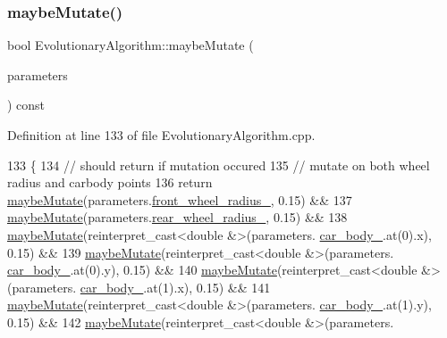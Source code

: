 \subsubsection{\texorpdfstring{maybe\+Mutate()}{maybeMutate()}\hspace{0.1cm}{\footnotesize\ttfamily [2/2]}}
{\footnotesize\ttfamily bool Evolutionary\+Algorithm\+::maybe\+Mutate (\begin{DoxyParamCaption}\item[{\hyperlink{classCarParameters}{Car\+Parameters} \&}]{parameters }\end{DoxyParamCaption}) const}



Definition at line 133 of file Evolutionary\+Algorithm.\+cpp.


\begin{DoxyCode}
133                                                                         \{
134     \textcolor{comment}{// should return if mutation occured}
135     \textcolor{comment}{// mutate on both wheel radius and carbody points}
136     \textcolor{keywordflow}{return} \hyperlink{classEvolutionaryAlgorithm_a19c58cc0434d314fb5378e3674546988}{maybeMutate}(parameters.\hyperlink{classCarParameters_ab66832af7618ebe04364630c92850096}{front\_wheel\_radius\_}, 0.15) &&
137            \hyperlink{classEvolutionaryAlgorithm_a19c58cc0434d314fb5378e3674546988}{maybeMutate}(parameters.\hyperlink{classCarParameters_a6d3c3fc1c4eef292a7f536da2a089bbd}{rear\_wheel\_radius\_}, 0.15) &&
138            \hyperlink{classEvolutionaryAlgorithm_a19c58cc0434d314fb5378e3674546988}{maybeMutate}(reinterpret\_cast<double &>(parameters.
      \hyperlink{classCarParameters_a304345d7fd7771c87421e87785bce810}{car\_body\_}.at(0).x), 0.15) &&
139            \hyperlink{classEvolutionaryAlgorithm_a19c58cc0434d314fb5378e3674546988}{maybeMutate}(reinterpret\_cast<double &>(parameters.
      \hyperlink{classCarParameters_a304345d7fd7771c87421e87785bce810}{car\_body\_}.at(0).y), 0.15) &&
140            \hyperlink{classEvolutionaryAlgorithm_a19c58cc0434d314fb5378e3674546988}{maybeMutate}(reinterpret\_cast<double &>(parameters.
      \hyperlink{classCarParameters_a304345d7fd7771c87421e87785bce810}{car\_body\_}.at(1).x), 0.15) &&
141            \hyperlink{classEvolutionaryAlgorithm_a19c58cc0434d314fb5378e3674546988}{maybeMutate}(reinterpret\_cast<double &>(parameters.
      \hyperlink{classCarParameters_a304345d7fd7771c87421e87785bce810}{car\_body\_}.at(1).y), 0.15) &&
142            \hyperlink{classEvolutionaryAlgorithm_a19c58cc0434d314fb5378e3674546988}{maybeMutate}(reinterpret\_cast<double &>(parameters.

\end{DoxyCode}
